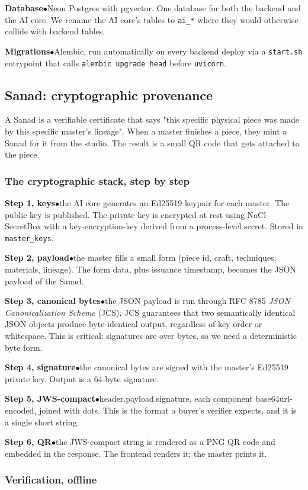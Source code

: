\documentclass[11pt,a4paper]{article}
\newcommand{\stack}[2]{%
  \par\noindent\textbf{\color{walnut}#1}\hspace{0.5em}\textcolor{rouge}{$\bullet$}\hspace{0.5em}\textcolor{faded}{#2}\par
}
\begin{document}
\stack{Database}{Neon Postgres with pgvector. One database for both
the backend and the AI core. We rename the AI core's tables to
\texttt{ai\_*} where they would otherwise collide with backend tables.}
\stack{Migrations}{Alembic, run automatically on every backend deploy
via a \texttt{start.sh} entrypoint that calls \texttt{alembic upgrade
head} before \texttt{uvicorn}.}

\subsection{Sanad: cryptographic provenance}

A Sanad is a verifiable certificate that says "this specific physical
piece was made by this specific master's lineage". When a master
finishes a piece, they mint a Sanad for it from the studio. The result
is a small QR code that gets attached to the piece.

\subsubsection*{The cryptographic stack, step by step}

\stack{Step 1, keys}{the AI core generates an Ed25519 keypair for each
master. The public key is published. The private key is encrypted at
rest using NaCl SecretBox with a key-encryption-key derived from a
process-level secret. Stored in \texttt{master\_keys}.}
\stack{Step 2, payload}{the master fills a small form (piece id, craft,
techniques, materials, lineage). The form data, plus issuance
timestamp, becomes the JSON payload of the Sanad.}
\stack{Step 3, canonical bytes}{the JSON payload is run through RFC
8785 \emph{JSON Canonicalization Scheme} (JCS). JCS guarantees that
two semantically identical JSON objects produce byte-identical output,
regardless of key order or whitespace. This is critical: signatures
are over bytes, so we need a deterministic byte form.}
\stack{Step 4, signature}{the canonical bytes are signed with the
master's Ed25519 private key. Output is a 64-byte signature.}
\stack{Step 5, JWS-compact}{header.payload.signature, each component
base64url-encoded, joined with dots. This is the format a buyer's
verifier expects, and it is a single short string.}
\stack{Step 6, QR}{the JWS-compact string is rendered as a PNG QR code
and embedded in the response. The frontend renders it; the master
prints it.}

\subsubsection*{Verification, offline}
\end{document}
